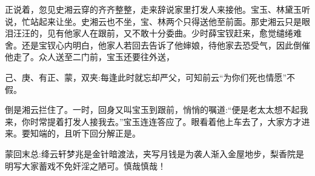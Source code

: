 \begin{parag}
    正说着，忽见史湘云穿的齐齐整整，走来辞说家里打发人来接他。宝玉、林黛玉听说，忙站起来让坐。史湘云也不坐，宝、林两个只得送他至前面。那史湘云只是眼泪汪汪的，见有他家人在跟前，又不敢十分委曲。少时薛宝钗赶来，愈觉缱绻难舍。还是宝钗心内明白，他家人若回去告诉了他婶娘，待他家去恐受气，因此倒催他走了。众人送至二门前，宝玉还要往外送，\begin{note}己、庚、有正、蒙，双夹:每逢此时就忘却严父，可知前云“为你们死也情愿”不假。\end{note}倒是湘云拦住了。一时，回身又叫宝玉到跟前，悄悄的嘱道:“便是老太太想不起我来，你时常提着打发人接我去。”宝玉连连答应了。眼看着他上车去了，大家方才进来。要知端的，且听下回分解正是。
\end{parag}


\begin{parag}
    \begin{note}蒙回末总:绛云轩梦兆是金针暗渡法，夹写月钱是为袭人渐入金屋地步，梨香院是明写大家蓄戏不免奸淫之陋可。慎哉慎哉！\end{note}
\end{parag}

